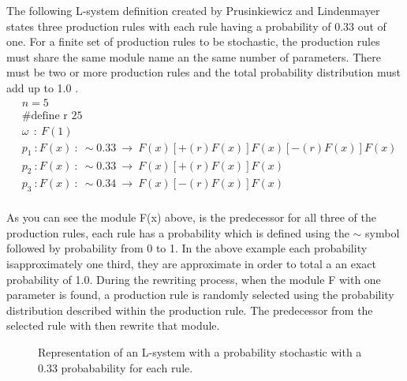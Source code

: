\begin{flushleft}
\vspace{5mm}

The following L-system definition created by Prusinkiewicz and Lindenmayer states three production rules with each rule having a probability of 0.33 out of one. For a finite set of production rules to be stochastic, the production rules must share the same module name an the same number of parameters. There must be two or more production rules and the total probability distribution must add up to 1.0 \cite{prusinkiewicz2012algorithmic}. \\

\begin{equation} \label{stochastic example}
\begin{aligned}
	&n=5\\
	&\text{\#define r 25}\\
	&\omega~~ :~ F(1)\\
	&p_1~ :  F(x)~ :~ \sim 0.33 ~ \rightarrow~ F(x)[+(r)F(x)]F(x)[-(r)F(x)]F(x)\\
	&p_2~ :  F(x)~ :~ \sim 0.33 ~ \rightarrow~ F(x)[+(r)F(x)]F(x)\\
	&p_3~ :  F(x)~ :~ \sim 0.34 ~ \rightarrow~ F(x)[-(r)F(x)]F(x)\\
\end{aligned}
\end{equation}

\vspace{5mm}

As you can see the module F(x) above, is the predecessor for all three of the production rules, each rule has a probability which is defined using the $\sim$ symbol followed by probability from 0 to  1. In the above example each probability isapproximately one third, they are approximate in order to total a an exact probability of 1.0. During the rewriting process, when the module F with one parameter is found, a production rule is randomly selected using the probability distribution described within the production rule. The predecessor from the selected rule with then rewrite that module. \\

\begin{figure}[htbp]
	{\centering
		\vspace{7px}
		\setlength{\fboxrule}{1pt}
		\caption{Representation of an L-system with a probability stochastic with a 0.33 probabability for each rule.} \label{stochastic diagram}
	}
\end{figure}


\end{flushleft}
